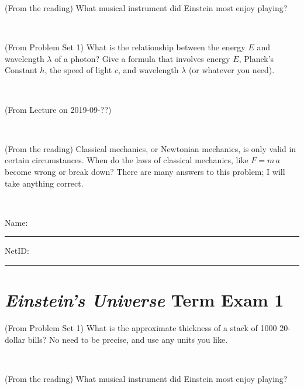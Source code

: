 \documentclass[12pt, letterpaper]{article}
\begin{document}
\clearpage


\begin{problem} (From the reading)
What musical instrument did Einstein most enjoy playing?
\end{problem}


\vfill ~

\begin{problem} (From Problem Set 1)
What is the relationship between the energy $E$ and wavelength
$\lambda$ of a photon? Give a formula that involves energy $E$,
Planck's Constant $h$, the speed of light $c$, and wavelength
$\lambda$ (or whatever you need).
\end{problem}

\vfill ~

\begin{problem} (From Lecture on 2019-09-??)
\end{problem}


\vfill ~

\begin{problem} (From the reading)
Classical mechanics, or Newtonian mechanics, is only valid in certain
circumstances. When do the laws of classical mechanics, like $F =
m\,a$ become wrong or break down? There are many answers to this
problem; I will take anything correct.
\end{problem}


\vfill ~


\cleardoublepage



\noindent
Name: \rule[-1ex]{0.60\textwidth}{0.1pt}
NetID: \rule[-1ex]{0.20\textwidth}{0.1pt}

\section*{\textsl{Einstein's Universe} Term Exam 1}
\setcounter{problem}{1}


\begin{problem} (From Problem Set 1)
What is the approximate thickness of a stack of 1000 20-dollar bills?
No need to be precise, and use any units you like.
\end{problem}


\vfill ~

\begin{problem} (From the reading)
What musical instrument did Einstein most enjoy playing?
\end{problem}


\vfill ~
\end{document}
